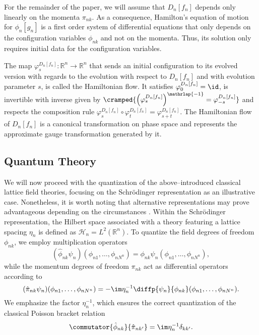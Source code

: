 For the remainder of the paper, we will assume that $D_n[f_n]$ depends only linearly on the momenta $\pi_{nk}$.
As a consequence, Hamilton's equation of motion  for $\phi_n[g_n]$ is a first order system of differential equations that only depends on the configuration variables $\phi_{nk}$ and not on the momenta.
Thus, its solution only requires initial data for the configuration variables.

The map $\varphi_s^{D_n[f_n]} \colon \mathbb R^n\to\mathbb R^n$ that sends an initial configuration to its evolved version with regards to the evolution with respect to $D_n[f_n]$ and with evolution parameter $s$, is called the Hamiltonian flow.
It satisfies $\varphi_0^{D_n[f_n]} = \id$, is invertible with inverse given by $\cramped{\left(\varphi_s^{D_n[f_n]}\right)^{\mathrlap{-1}} = \varphi_{-s}^{D_n[f_n]}}$ and respects the composition rule $\varphi_s^{D_n[f_n]} \circ \varphi_t^{D_n[f_n]} = \varphi_{s+t}^{D_n[f_n]}$.
The Hamiltonian flow of $D_n[f_n]$ is a canonical transformation on phase space and represents the approximate gauge transformation generated by it.

\subsection{Quantum Theory}
We will now proceed with the quantization of the above--introduced classical lattice field theories, focusing on the Schrödinger representation as an illustrative case. 
Nonetheless, it is worth noting that alternative representations may prove advantageous depending on the circumstances \parencite[cf.]{cholesky}.
Within the Schrödinger representation, the Hilbert space associated with a theory featuring a lattice spacing $\eta_n$ is defined as $\mathcal H_n = L^2(\mathbb R^n)$.
To quantize the field degrees of freedom $\phi_{nk}$, we employ multiplication operators
\begin{equation}
    (\hat\phi_{nk}\psi_n)(\phi_{n1},\ldots,\phi_{n N^n}) = \phi_{nk}\psi_n(\phi_{n1},\ldots,\phi_{n N^n}),
\end{equation}
while the momentum degrees of freedom $\pi_{nk}$ act as differential operators according to
\begin{equation}
    (\hat\pi_{nk}\psi_n)(\phi_{n1},\ldots,\phi_{n N^n}) = -\im\eta_n^{-1}\diffp{\psi_n}{\phi_{nk}}(\phi_{n1},\ldots,\phi_{n N^n}) .
\end{equation}
We emphasize the factor $\eta_n^{-1}$, which ensures the correct quantization of the classical Poisson bracket relation 
\begin{equation}
    \commutator{\hat\phi_{nk}}{\hat\pi_{nk'}} = \im\eta_n^{-1} \delta_{kk'} .
\end{equation}

